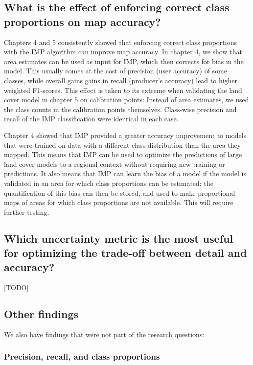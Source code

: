     \subsection{What is the effect of enforcing correct class proportions on map accuracy?}
    \label{syn:rq4}
    
        Chapters 4 and 5 consistently showed that enforcing correct class proportions with the IMP algorithm can improve map accuracy. In chapter 4, we show that area estimates can be used as input for IMP, which then corrects for bias in the model. This usually comes at the cost of precision (user accuracy) of some classes, while overall gains gains in recall (producer's accuracy) lead to higher weighted F1-scores. This effect is taken to its extreme when validating the land cover model in chapter 5 on calibration points: Instead of area estimates, we used the class counts in the calibration points themselves. Class-wise precision and recall of the IMP classification were identical in each case. 

        Chapter 4 showed that IMP provided a greater accuracy improvement to models that were trained on data with a different class distribution than the area they mapped. This means that IMP can be used to optimize the predictions of large land cover models to a regional context without requiring new training or predictions. It also means that IMP can learn the bias of a model if the model is validated in an area for which class proportions can be estimated; the quantification of this bias can then be stored, and used to make proportional maps of areas for which class proportions are not available. This will require further testing. 
    
    \subsection{Which uncertainty metric is the most useful for optimizing the trade-off between detail and accuracy?}
    \label{syn:rq5}

    [TODO]

    \subsection{Other findings}
    We also have findings that were not part of the research questions:
        
    \subsubsection{Precision, recall, and class proportions}
        
